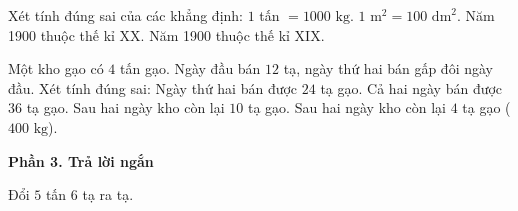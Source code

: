 \begin{ex} %
Xét tính đúng sai của các khẳng định:
\choiceTF
{\True $1$ tấn $= 1000\text{ kg}$.}
{\True $1\text{ m}^2 = 100\text{ dm}^2$.}
{Năm 1900 thuộc thế kỉ XX.}
{\True Năm 1900 thuộc thế kỉ XIX.}
\end{ex}

\begin{ex} %
Một kho gạo có $4$ tấn gạo. Ngày đầu bán $12$ tạ, ngày thứ hai bán gấp đôi ngày đầu. Xét tính đúng sai:
\choiceTF
{\True Ngày thứ hai bán được $24$ tạ gạo.}
{\True Cả hai ngày bán được $36$ tạ gạo.}
{Sau hai ngày kho còn lại $10$ tạ gạo.}
{\True Sau hai ngày kho còn lại $4$ tạ gạo ($400\text{ kg}$).}
\end{ex}

\textbf{Phần 3. Trả lời ngắn}

\begin{ex} %
Đổi $5$ tấn $6$ tạ ra tạ.
\end{ex}

